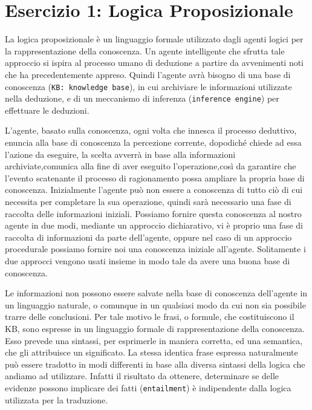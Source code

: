 \raggedright
{}
	\label{ch:cc}
	\section{Esercizio 1: Logica Proposizionale}
		\label{sec:es1}
		La logica proposizionale è un linguaggio formale utilizzato dagli agenti logici per la rappresentazione della conoscenza. Un agente intelligente che sfrutta tale approccio si ispira al processo umano di deduzione a partire da avvenimenti noti che ha precedentemente appreso. Quindi l'agente avrà bisogno di una base di conoscenza (\texttt{KB: knowledge base}), in cui archiviare le informazioni utilizzate nella deduzione, e di un meccanismo di inferenza (\texttt{inference engine}) per effettuare le deduzioni.
		\par
		L'agente, basato sulla conoscenza, ogni volta che innesca il processo deduttivo, enuncia alla base di conoscenza la percezione corrente, dopodiché chiede ad essa l'azione da eseguire, la scelta avverrà in base alla informazioni archiviate,comunica alla fine di aver eseguito l'operazione,così da garantire che l'evento scatenante il processo di ragionamento possa ampliare la propria base di conoscenza. Inizialmente l'agente può non essere a conoscenza di tutto ciò di cui necessita per completare la sua operazione, quindi sarà necessario una fase di raccolta delle informazioni iniziali. Possiamo fornire questa conoscenza al nostro agente in due modi, mediante un approccio dichiarativo, vi è proprio una fase di raccolta di informazioni da parte dell'agente, oppure nel caso di un approccio procedurale possiamo fornire noi una conoscenza iniziale all'agente. Solitamente i due approcci vengono usati insieme in modo tale da avere una buona base di conoscenza.
		\par
		Le informazioni non possono essere salvate nella base di conoscenza dell'agente in un linguaggio naturale, o comunque in un qualsiasi modo da cui non sia possibile trarre delle conclusioni. Per tale motivo le frasi, o formule, che costituiscono il KB, sono espresse in un linguaggio formale di rappresentazione della conoscenza. Esso prevede una sintassi, per esprimerle in maniera corretta, ed una semantica, che gli attribuisce un significato. %
		La stessa identica frase espressa naturalmente può essere tradotto in modi differenti in base alla diversa sintassi della logica che andiamo ad utilizzare. Infatti il risultato da ottenere, determinare se delle evidenze possono implicare dei fatti (\texttt{entailment}) è indipendente dalla logica utilizzata per la traduzione.
